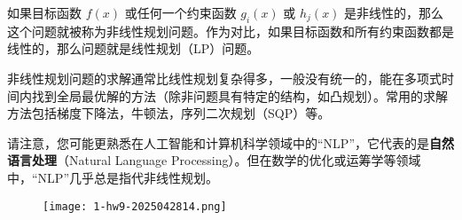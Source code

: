 如果目标函数 $f(x)$ 或任何一个约束函数 $g_i(x)$ 或 $h_j(x)$ 是非线性的，那么这个问题就被称为非线性规划问题。作为对比，如果目标函数和所有约束函数都是线性的，那么问题就是线性规划（LP）问题。

非线性规划问题的求解通常比线性规划复杂得多，一般没有统一的，能在多项式时间内找到全局最优解的方法（除非问题具有特定的结构，如凸规划）。常用的求解方法包括梯度下降法，牛顿法，序列二次规划（SQP）等。

请注意，您可能更熟悉在人工智能和计算机科学领域中的“NLP”，它代表的是\textbf{自然语言处理}（Natural Language Processing）。但在数学的优化或运筹学等领域中，“NLP”几乎总是指代非线性规划。

\begin{exercise}
\begin{figure}[H]
\centering
\texttt{[image: 1-hw9-2025042814.png]}
\label{}
\end{figure}
\end{exercise}
